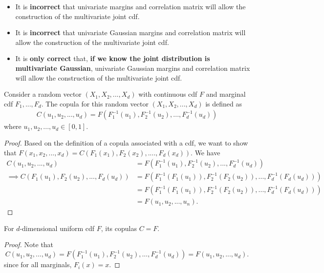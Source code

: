 \begin{refsection}
\begin{note}[caution!]\hfill
\begin{itemize}
	\item It is \textbf{incorrect} that univariate margins and correlation matrix will allow the construction of the multivariate joint cdf.
	\item It is \textbf{incorrect} that univariate Gaussian margins and correlation matrix will allow the construction of the multivariate joint cdf.
	\item It is \textbf{only correct} that, \textbf{if we know the joint distribution is multivariate Gaussian}, univariate Gaussian margins and correlation matrix will allow the construction of the multivariate joint cdf.
\end{itemize}	
\end{note}





\begin{theorem}\label{ch:statistical-models:th:constructCopulaForJointDistribution}
	Consider a random vector $(X_1,X_2,...,X_d)$ with continuous cdf $F$ and marginal cdf $F_1,...,F_d$. The copula for this random vector $(X_1,X_2,...,X_d)$ is defined as
	\begin{align*}
	C(u_1,u_2,...,u_d) = F(F_1^{-1}(u_1),F_2^{-1}(u_2),..., F_d^{-1}(u_d))
	\end{align*}
where $u_1,u_2,...,u_d\in [0,1]$.	
\end{theorem}
\begin{proof}
Based on the definition of a copula associated with a cdf, we want to show that $F(x_1,x_2,...,x_d) = C(F_1(x_1),F_2(x_2),....,F_d(x_d)).$
We have	
\begin{align*}
C(u_1,u_2,...,u_d) &= F(F_1^{-1}(u_1),F_2^{-1}(u_2),..., F_d^{-1}(u_d)) \\
\implies C(F_1(u_1),F_2(u_2),...,F_d(u_d)) &= F(F_1^{-1}(F_1(u_1)),F_2^{-1}(F_2(u_2)),..., F_d^{-1}(F_d(u_d))) \\
&= F(F_1^{-1}(F_1(u_1)),F_2^{-1}(F_2(u_2)),..., F_d^{-1}(F_d(u_d))) \\
&= F(u_1,u_2,...,u_n).
\end{align*}	
\end{proof}

\begin{lemma}\label{ch:statistical-models:th:CopulaOfUniformDistribution}
For $d$-dimensional uniform cdf $F$, its copulas $C = F$.
\end{lemma}
\begin{proof}
Note that
$$C(u_1,u_2,...,u_d) = F(F_1^{-1}(u_1),F_2^{-1}(u_2),..., F_d^{-1}(u_d))
= F(u_1,u_2,...,u_d).$$
since for all marginals, $F_i(x) = x.$
\end{proof}





\end{refsection}

